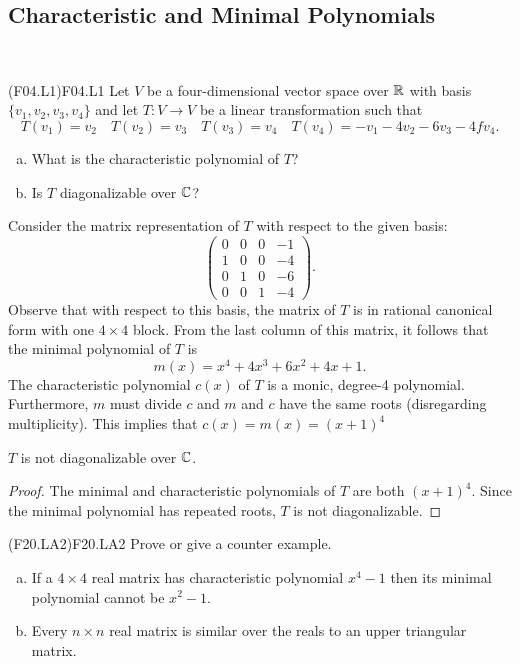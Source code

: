 \documentclass[../AlgebraQualSolutions.tex]{subfiles}
\begin{document}
\subsection{Characteristic and Minimal Polynomials}
 

\begin{prob}{(F04.L1)}{F04.L1}
	Let $V$ be a four-dimensional vector space over $\mathbb{R}$ with basis $\{v_1,v_2,v_3,v_4\}$ and let $T: V \to V$ be a linear transformation such that
		\[T(v_1) = v_2 \quad T(v_2) = v_3 \quad T(v_3) = v_4 \quad T(v_4) = -v_1 -4v_2 -6v_3 - 4fv_4.\]
	\begin{enumerate}[(a)]
		\item What is the characteristic polynomial of $T$?
		\item Is $T$ diagonalizable over $\mathbb{C}$?
	\end{enumerate}
\end{prob}

\begin{solution}
	Consider the matrix representation of $T$ with respect to the given basis:
		\[\begin{pmatrix}
			0 & 0 & 0 & -1\\
			1 & 0 & 0 & -4\\
			0 & 1 & 0 & -6\\
			0 & 0 & 1 & -4 \end{pmatrix}.\]
		Observe that with respect to this basis, the matrix of $T$ is in rational canonical form with one $4 \times 4$ block. From the last column of this matrix, it follows that the minimal polynomial of $T$ is 
			\[m(x) = x^4 + 4x^3 + 6x^2 + 4x + 1.\]
		The characteristic polynomial $c(x)$ of $T$ is a monic, degree-4 polynomial. Furthermore, $m$ must divide $c$ and $m$ and $c$ have the same roots (disregarding multiplicity). This implies that $c(x) = m(x) = (x + 1)^4$
\end{solution}

\begin{claim}
	$T$ is not diagonalizable over $\mathbb{C}$.

	\begin{proof}
		The minimal and characteristic polynomials of $T$ are both $(x + 1)^4$. Since the minimal polynomial has repeated roots, $T$ is not diagonalizable.
	\end{proof}
\end{claim}

\begin{prob}{(F20.LA2)}{F20.LA2}
	Prove or give a counter example.
	\begin{enumerate}[(a)]
	\item If a $4 \times 4$ real matrix has characteristic polynomial $x^4 -1$ then its minimal polynomial cannot be $x^2 - 1$.
	\item Every $n \times n$ real matrix is similar over the reals to an upper triangular matrix.
	\end{enumerate}
	\end{prob}
	
\end{document}

